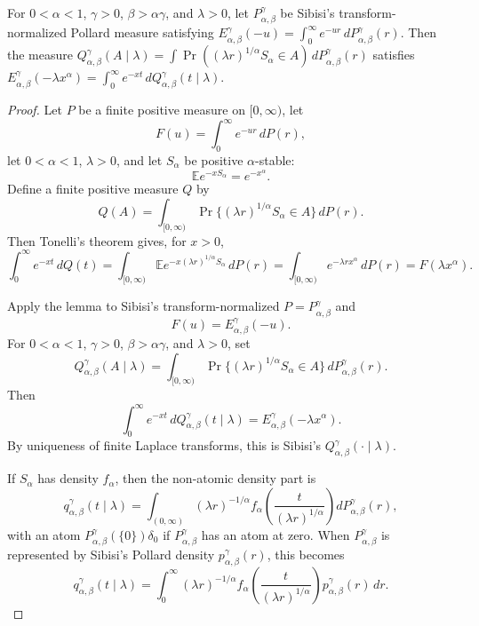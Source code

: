 \begin{proposition}
\label{res:prabhakar-q-stable-subordination-normal-form}
For \(0<\alpha<1\), \(\gamma>0\), \(\beta>\alpha\gamma\), and \(\lambda>0\), let \(P^\gamma_{\alpha,\beta}\) be Sibisi's transform-normalized Pollard measure satisfying \(E^\gamma_{\alpha,\beta}(-u)=\int_0^\infty e^{-ur}\,dP^\gamma_{\alpha,\beta}(r)\). Then the measure \(Q^\gamma_{\alpha,\beta}(A\mid\lambda)=\int\Pr((\lambda r)^{1/\alpha}S_\alpha\in A)\,dP^\gamma_{\alpha,\beta}(r)\) satisfies \(E^\gamma_{\alpha,\beta}(-\lambda x^\alpha)=\int_0^\infty e^{-xt}\,dQ^\gamma_{\alpha,\beta}(t\mid\lambda)\).
\end{proposition}
\begin{proof}
Let \(P\) be a finite positive measure on \([0,\infty)\), let
\[
F(u)=\int_0^\infty e^{-ur}\,dP(r),
\]
let \(0<\alpha<1\), \(\lambda>0\), and let \(S_\alpha\) be positive \(\alpha\)-stable:
\[
\mathbb E e^{-xS_\alpha}=e^{-x^\alpha}.
\]
Define a finite positive measure \(Q\) by
\[
Q(A)=\int_{[0,\infty)}
\Pr\{(\lambda r)^{1/\alpha}S_\alpha\in A\}\,dP(r).
\]
Then Tonelli's theorem gives, for \(x>0\),
\[
\int_0^\infty e^{-xt}\,dQ(t)
=\int_{[0,\infty)}
\mathbb E e^{-x(\lambda r)^{1/\alpha}S_\alpha}\,dP(r)
=\int_{[0,\infty)}e^{-\lambda r x^\alpha}\,dP(r)
=F(\lambda x^\alpha).
\]

Apply the lemma to Sibisi's transform-normalized \(P=P^\gamma_{\alpha,\beta}\) and
\[
F(u)=E^\gamma_{\alpha,\beta}(-u).
\]
For \(0<\alpha<1\), \(\gamma>0\), \(\beta>\alpha\gamma\), and \(\lambda>0\), set
\[
Q^\gamma_{\alpha,\beta}(A\mid\lambda)
=\int_{[0,\infty)}
\Pr\{(\lambda r)^{1/\alpha}S_\alpha\in A\}\,
dP^\gamma_{\alpha,\beta}(r).
\]
Then
\[
\int_0^\infty e^{-xt}\,dQ^\gamma_{\alpha,\beta}(t\mid\lambda)
=E^\gamma_{\alpha,\beta}(-\lambda x^\alpha).
\]
By uniqueness of finite Laplace transforms, this is Sibisi's \(Q^\gamma_{\alpha,\beta}(\cdot\mid\lambda)\).

If \(S_\alpha\) has density \(f_\alpha\), then the non-atomic density part is
\[
q^\gamma_{\alpha,\beta}(t\mid\lambda)
=\int_{(0,\infty)}
(\lambda r)^{-1/\alpha}
f_\alpha\!\left(\frac{t}{(\lambda r)^{1/\alpha}}\right)
dP^\gamma_{\alpha,\beta}(r),
\]
with an atom \(P^\gamma_{\alpha,\beta}(\{0\})\delta_0\) if \(P^\gamma_{\alpha,\beta}\) has an atom at zero. When \(P^\gamma_{\alpha,\beta}\) is represented by Sibisi's Pollard density \(p^\gamma_{\alpha,\beta}(r)\), this becomes
\[
q^\gamma_{\alpha,\beta}(t\mid\lambda)
=\int_0^\infty
(\lambda r)^{-1/\alpha}
f_\alpha\!\left(\frac{t}{(\lambda r)^{1/\alpha}}\right)
p^\gamma_{\alpha,\beta}(r)\,dr.
\]


\end{proof}
